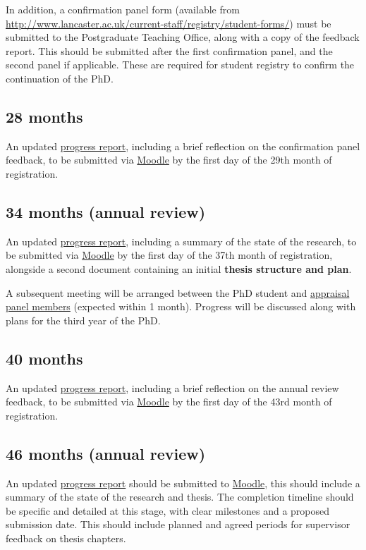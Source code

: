 \documentclass[12pt,a4paper]{article}
\begin{document}
In addition, a confirmation panel form (available from \url{http://www.lancaster.ac.uk/current-staff/registry/student-forms/}) must be submitted to the Postgraduate Teaching Office, along with a copy of the feedback report. This should be submitted after the first confirmation panel, and the second panel if applicable. These are required for student registry to confirm the continuation of the PhD.


\subsection{28 months} \label{sec:28months}
An updated \hyperref[sec:report]{progress report}, including a brief reflection on the confirmation panel feedback, to be submitted via \href{https://modules.lancaster.ac.uk/course/view.php?id=7050}{Moodle}  by the first day of the 29th month of registration.


\subsection{34 months (annual review)} \label{sec:34months}
An updated \hyperref[sec:report]{progress report}, including a summary of the state of the research, to be submitted via \href{https://modules.lancaster.ac.uk/course/view.php?id=7050}{Moodle}  by the first day of the 37th month of registration, alongside a second document containing an initial \textbf{thesis structure and plan}.

A subsequent meeting will be arranged between the PhD student and \hyperref[sec:panel]{appraisal panel members} (expected within 1 month). Progress will be discussed along with plans for the third year of the PhD.


\subsection{40 months} \label{sec:40months}
An updated \hyperref[sec:report]{progress report}, including a brief reflection on the annual review feedback, to be submitted via \href{https://modules.lancaster.ac.uk/course/view.php?id=7050}{Moodle}  by the first day of the 43rd month of registration.


\subsection{46 months (annual review)} \label{sec:46months}
An updated \hyperref[sec:report]{progress report} should be submitted to \href{https://modules.lancaster.ac.uk/course/view.php?id=7050}{Moodle}, this should include a summary of the state of the research and thesis. The completion timeline should be specific and detailed at this stage, with clear milestones and a proposed submission date. This should include planned and agreed periods for supervisor feedback on thesis chapters.
\end{document}
